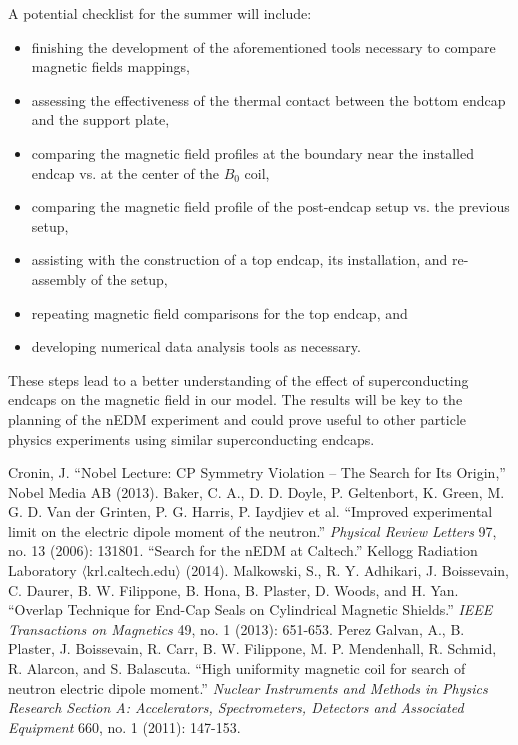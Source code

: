 \documentclass[twocolumn,aps,prb,citeautoscript]{revtex4-1}
\begin{document}
A potential checklist for the summer will include:
\begin{itemize}
\item finishing the development of the aforementioned tools necessary to
compare magnetic fields mappings,
\item assessing the effectiveness of the thermal contact between the bottom
endcap and the support plate,
\item comparing the magnetic field profiles at the boundary near the installed
endcap vs. at the center of the $B_0$ coil,
\item comparing the magnetic field profile of the post-endcap setup vs. the
previous setup,
\item assisting with the construction of a top endcap, its installation, and
re-assembly of the setup,
\item repeating magnetic field comparisons for the top endcap, and
\item developing numerical data analysis tools as necessary.
\end{itemize}

These steps lead to a better understanding of the effect of
superconducting endcaps on the magnetic field in our model. The
results will be key to the planning of the nEDM experiment and could prove
useful to other particle physics experiments using similar superconducting
endcaps.

\begin{thebibliography}{}
 Cronin, J. ``Nobel Lecture: CP Symmetry Violation – The Search
for Its Origin,'' Nobel Media AB (2013).
 Baker, C. A., D. D. Doyle, P. Geltenbort, K. Green, M. G. D. Van der Grinten, P. G. Harris, P. Iaydjiev et al. ``Improved experimental limit on the electric dipole moment of the neutron.'' \textit{Physical Review Letters} 97, no. 13 (2006): 131801.
 ``Search for the nEDM at Caltech.'' Kellogg Radiation Laboratory
$\langle$krl.caltech.edu$\rangle$ (2014).
 Malkowski, S., R. Y. Adhikari, J. Boissevain, C. Daurer, B. W. Filippone, B. Hona, B. Plaster, D. Woods, and H. Yan. ``Overlap Technique for End-Cap Seals on Cylindrical Magnetic Shields.'' \textit{IEEE Transactions on Magnetics} 49, no. 1 (2013): 651-653.
 Perez Galvan, A., B. Plaster, J. Boissevain, R. Carr, B. W. Filippone, M. P. Mendenhall, R. Schmid, R. Alarcon, and S. Balascuta. ``High uniformity magnetic coil for search of neutron electric dipole moment.'' \textit{Nuclear Instruments and Methods in Physics Research Section A: Accelerators, Spectrometers, Detectors and Associated Equipment} 660, no. 1 (2011): 147-153.
\end{thebibliography}
\end{document}
